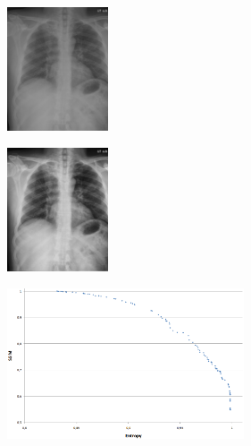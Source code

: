 \documentclass[spanish,twocolumn]{article}
\begin{document}
{\begin{minipage}[b]{1.0\linewidth}
\end{minipage}
\vspace{1.1cm}

\begin{minipage}[b]{1.0\linewidth}
  
   \begin{minipage}[t]{0.3\linewidth}  
        \centering
        \includegraphics[width=3cm]{Figures/1000_IM-0003-1001.png}
    \end{minipage}
  \hspace{1pt}
   \begin{minipage}[t]{0.3\linewidth}  
        \centering
        \includegraphics[width=3cm]{Figures/8178-1000_IM-0003-1001.png}
    \end{minipage}
    \vspace{0.5cm}
   \begin{minipage}[t]{0.3\linewidth}  
        \centering
        \includegraphics[width=7cm]{Figures/pareto_1000_IM-0003-1001.png}
    \end{minipage}


\end{minipage}}
\end{document}
